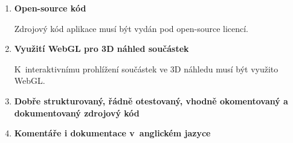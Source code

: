 \begin{enumerate}[label=NP-\arabic*,resume]
    \item \label{np:opensource} \textbf{Open-source kód}

    Zdrojový kód aplikace musí být vydán pod open-source licencí.

    \item \label{np:webgl} \textbf{Využití WebGL pro 3D náhled součástek}
    
    K~interaktivnímu prohlížení součástek ve 3D náhledu musí být využito \gls{WebGL}.

    \item \label{np:structure} \textbf{Dobře strukturovaný, řádně otestovaný, vhodně okomentovaný a dokumentovaný zdrojový kód}
    \item \label{np:english} \textbf{Komentáře i dokumentace v~anglickém jazyce}
\end{enumerate}